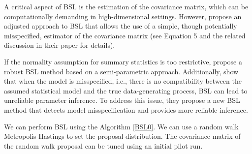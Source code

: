 A critical aspect of BSL is the estimation of the covariance matrix, which can be computationally demanding in high-dimensional settings. However, \cite{nott2023bayesian} propose an adjusted approach to BSL that allows the use of a simple, though potentially misspecified, estimator of the covariance matrix (see Equation 5 and the related discussion in their paper for details).

If the normality assumption for summary statistics is too restrictive, \cite{an2020robust} propose a robust BSL method based on a semi-parametric approach. Additionally, \cite{frazier2021robust} show that when the model is misspecified, i.e., there is no compatibility between the assumed statistical model and the true data-generating process, BSL can lead to unreliable parameter inference. To address this issue, they propose a new BSL method that detects model misspecification and provides more reliable inference.

We can perform BSL using the Algorithm \ref{BSL0}. We can use a random walk Metropolis-Hastings to set the proposal distribution. The covariance matrix of the random walk proposal can be tuned using an initial pilot run.

